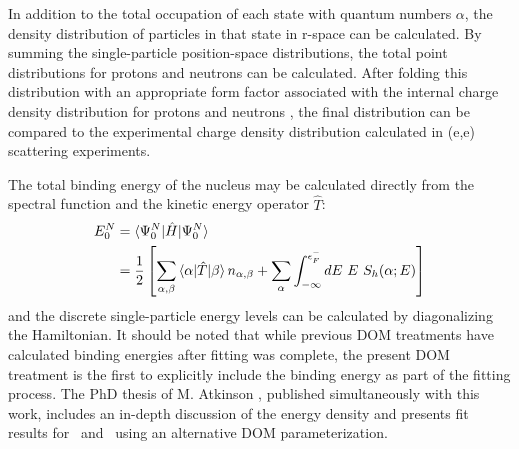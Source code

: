 In addition to the total occupation of each state with quantum numbers $\alpha$,
the density distribution of particles in that state in r-space can be calculated. By summing the
single-particle position-space distributions, the total point distributions for
protons and neutrons can be calculated.
After folding this distribution with an appropriate form factor associated with
the internal charge density
distribution for protons and neutrons \cite{Brown1979}, the final distribution can be compared
to the experimental charge density distribution calculated in (e,e) scattering experiments.

The total binding energy of the nucleus may be calculated directly from the spectral function and the
kinetic energy operator $\hat{T}$:
\begin{equation} \label{TotalEnergyEquation}
    \begin{split}
        E^{N}_{0} & = \braket{\Psi^{N}_{0}|\hat{H}|\Psi^{N}_{0}}\\
        & = \frac{1}{2} \left[\sum_{\alpha,\beta}\braket{\alpha|\hat{T}|\beta}n_{\alpha,\beta}
        + \sum_{\alpha}\int_{-\infty}^{\epsilon_{F}^{-}}dE\ E\ S_{h}(\alpha;E)\right]
    \end{split}
\end{equation}
and the discrete single-particle energy levels can be calculated by diagonalizing the
Hamiltonian. It should be noted that while previous DOM treatments have
calculated binding energies after fitting was complete, the present DOM treatment is the first to
explicitly include the binding energy as part of the fitting process. The PhD
thesis of M. Atkinson \cite{AtkinsonPhDThesis}, published simultaneously with
this work, includes an in-depth discussion of the energy density and presents
fit results for \caAughtEight\ and \pbEight\ using an alternative DOM
parameterization.

